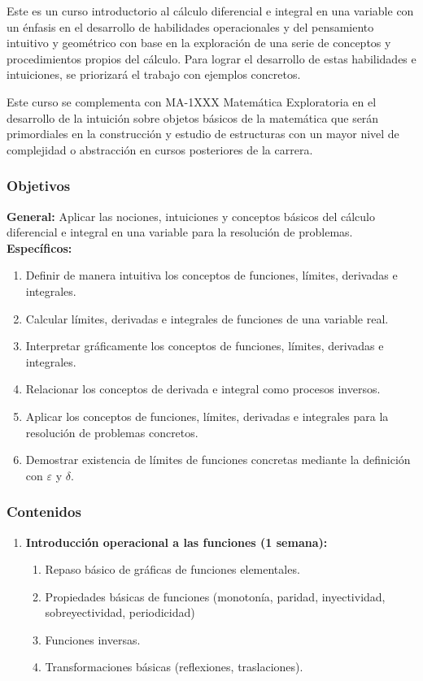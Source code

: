 \begin{refsection}
Este es un curso introductorio al cálculo diferencial e integral en una variable con un énfasis en el desarrollo de habilidades operacionales y del pensamiento intuitivo y geométrico con base en la exploración de una serie de conceptos y procedimientos propios del cálculo. Para lograr el desarrollo de estas habilidades e intuiciones, se priorizará el trabajo con ejemplos concretos.

Este curso se complementa con MA-1XXX Matemática Exploratoria en el desarrollo de la intuición sobre objetos básicos de la matemática que serán primordiales en la construcción y estudio de estructuras con un mayor nivel de complejidad o abstracción en cursos posteriores de la carrera.





\subsubsection*{Objetivos}

\textbf{General:} Aplicar las nociones, intuiciones y conceptos básicos del cálculo diferencial e integral en una variable para la resolución de problemas. \\

\textbf{Específicos:}

\begin{enumerate}
\item Definir de manera intuitiva los conceptos de funciones, límites, derivadas e integrales.
\item Calcular límites, derivadas e integrales de funciones de una variable real.
\item Interpretar gráficamente los conceptos de funciones, límites, derivadas e integrales.
\item Relacionar los conceptos de derivada e integral como procesos inversos.
\item Aplicar los conceptos de funciones, límites, derivadas e integrales para la resolución de problemas concretos.
\item Demostrar existencia de límites de funciones concretas mediante la definición con $\varepsilon$ y $\delta$.
\end{enumerate}

\subsubsection*{Contenidos}

\begin{enumerate}
\item \textbf{Introducción operacional a las funciones (1 semana):} 
\begin{enumerate}
    \item Repaso básico de gráficas de funciones elementales.
    \item Propiedades básicas de funciones (monotonía, paridad, inyectividad, sobreyectividad, periodicidad)
    \item Funciones inversas.
    \item Transformaciones básicas (reflexiones, traslaciones).
\end{enumerate}


\end{enumerate}
\end{refsection}
